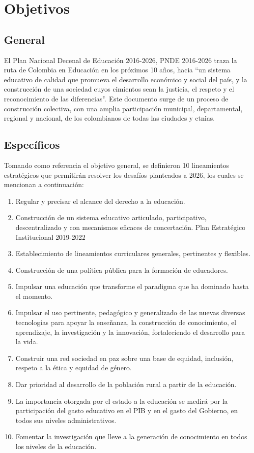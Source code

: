 \newpage
\section{Objetivos}

\subsection{General}
El Plan Nacional Decenal de Educación 2016-2026, PNDE 2016-2026 traza la ruta de Colombia en Educación en los próximos 10 años, hacia “un sistema educativo de calidad que promueva el desarrollo económico y social del país, y la construcción de una sociedad cuyos cimientos sean la justicia, el respeto y el reconocimiento de las diferencias”. Este documento surge de un proceso de construcción colectiva, con una amplia participación
municipal, departamental, regional y nacional, de los colombianos de todas las ciudades y etnias.

\subsection{Específicos}
Tomando como referencia el objetivo general, se definieron 10 lineamientos estratégicos que permitirán resolver los desafíos planteados a 2026, los cuales se
mencionan a continuación:

\begin{enumerate}
	\item Regular y precisar el alcance del derecho a la educación.
	\item Construcción de un sistema educativo articulado, participativo,
	descentralizado y con mecanismos eficaces de concertación.
	Plan Estratégico Institucional 2019-2022
	\item Establecimiento de lineamientos curriculares generales, pertinentes y flexibles.
	\item Construcción de una política pública para la formación de educadores.
	\item  Impulsar una educación que transforme el paradigma que ha dominado hasta el momento.
	\item Impulsar el uso pertinente, pedagógico y generalizado de las nuevas diversas tecnologías para apoyar la enseñanza, la construcción de conocimiento, el aprendizaje, la investigación y la innovación, fortaleciendo el desarrollo para la vida.
	\item Construir una red sociedad en paz sobre una base de equidad, inclusión, respeto a la ética y equidad de género.
	\item Dar prioridad al desarrollo de la población rural a partir de la educación.
	\item La importancia otorgada por el estado a la educación se medirá por
	la participación del gasto educativo en el PIB y en el gasto del Gobierno, en todos sus niveles administrativos.
	\item Fomentar la investigación que lleve a la generación de conocimiento en todos los niveles de la educación.
\end{enumerate}


